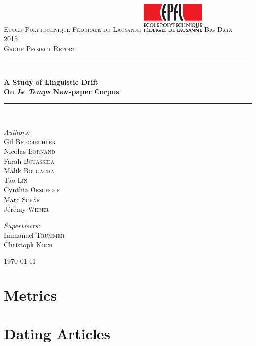 \documentclass[a4paper,11pt] {article}
\newcommand{\HRule}{\rule{\linewidth}{0.5mm}}
\begin{document}
\begin{titlepage}
\begin{center}
\textsc{\LARGE Ecole Polytechnique Fédérale de Lausanne}
\vskip 0.5cm
\includegraphics[height=1.5cm]{Pictures/EPFL-Logo-CMJN.eps}
\vskip 0.5cm
\textsc{\Large Big Data\\
 2015}\\[1.5cm]

\textsc{\Large Group Project Report}\\[3cm]

\HRule \\[0.4cm]
{ \huge \bfseries A Study of Linguistic Drift\\[0.5cm] }
{ \huge \bfseries On \emph{Le Temps} Newspaper Corpus\\[0.4cm] }

\HRule \\[3.5cm]

\begin{minipage}{0.5\textwidth}
\begin{flushleft} \large
\textit{Authors:}\\
Gil \textsc{Brechbühler}\\
Nicolas \textsc{Bornand}\\
Farah \textsc{Bouassida}\\
Malik \textsc{Bougacha}\\
Tao \textsc{Lin}\\
Cynthia \textsc{Oeschger}\\
Marc \textsc{Schär}\\
Jérémy \textsc{Weber}\\
\end{flushleft}
\end{minipage}
\begin{minipage}{0.4\textwidth}
\begin{flushright} \large
\textit{Supervisors:} \\
Immanuel \textsc{Trummer}\\
Christoph \textsc{Koch}\\
\end{flushright}
\end{minipage}

\vfill

{\large \today}

\end{center}
\end{titlepage}

\tableofcontents
\newpage{}






\section{Metrics}\label{metrics}



\section{Dating Articles}



\end{document}
